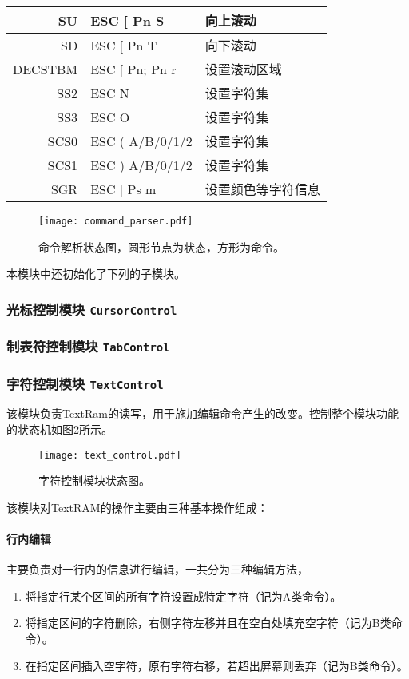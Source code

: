 \begin{longtable}{|r|l|l|}
SU & ESC [ Pn S &向上滚动 \\ \hline
SD & ESC [ Pn T &向下滚动 \\ \hline
DECSTBM & ESC [ Pn; Pn r &设置滚动区域 \\ \hline \hline

SS2 & ESC N&设置字符集 \\ \hline
SS3 & ESC O&设置字符集 \\ \hline
SCS0 & ESC ( A/B/0/1/2 & 设置字符集 \\ \hline
SCS1 & ESC ) A/B/0/1/2 &设置字符集 \\ \hline \hline

SGR & ESC [ Ps m &设置颜色等字符信息 \\ \hline
\end{longtable}

\begin{landscape}
\begin{figure}[htbp]
\centerline{
\texttt{[image: command\_parser.pdf]}
}
\caption{命令解析状态图，圆形节点为状态，方形为命令。}
\label{fig:command_parser}
\end{figure}
\end{landscape}

本模块中还初始化了下列的子模块。

\subsubsection{光标控制模块 \texttt{CursorControl}}
\subsubsection{制表符控制模块 \texttt{TabControl}}
\subsubsection{字符控制模块 \texttt{TextControl}}
该模块负责TextRam的读写，用于施加编辑命令产生的改变。控制整个模块功能的状态机如图\ref{fig:text_control}所示。

\begin{figure}[htbp]
\centerline{
\texttt{[image: text\_control.pdf]}
}
\caption{字符控制模块状态图。}
\label{fig:text_control}
\end{figure}

该模块对TextRAM的操作主要由三种基本操作组成：

\paragraph{行内编辑}
主要负责对一行内的信息进行编辑，一共分为三种编辑方法，
\begin{enumerate}
	\item 将指定行某个区间的所有字符设置成特定字符（记为A类命令）。
	\item 将指定区间的字符删除，右侧字符左移并且在空白处填充空字符（记为B类命令）。
	\item 在指定区间插入空字符，原有字符右移，若超出屏幕则丢弃（记为B类命令）。
\end{enumerate}

